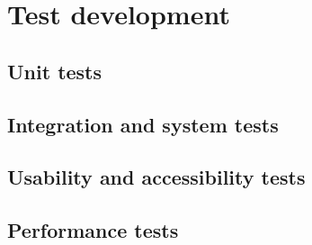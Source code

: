 \renewcommand{\documentname}{Test development}

\chapter{Test development}


\section{Unit tests}

\section{Integration and system tests}

\section{Usability and accessibility tests}

\section{Performance tests}

